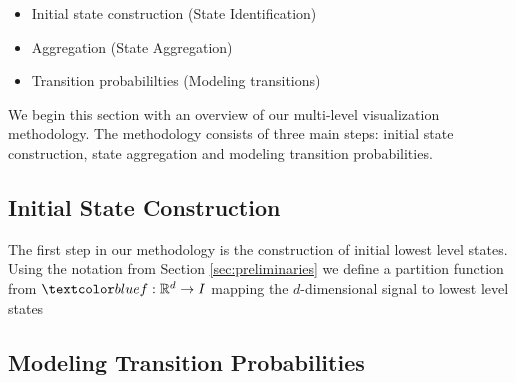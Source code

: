 \begin{itemize}
	\item Initial state construction (State Identification)
	\item Aggregation (State Aggregation)
	\item Transition probabililties (Modeling transitions)
\end{itemize}

We begin this section with an overview of our multi-level visualization methodology. The methodology
consists of three main steps: initial state construction, state aggregation and modeling transition
probabilities.

\subsection{Initial State Construction}
\label{sec:framework-states}

The first step in our methodology is the construction of initial lowest level states. Using the notation
from Section \ref{sec:preliminaries} we define a partition function 
from $\lstopar{f}: \mathbb{R}^d \rightarrow I$ mapping the $d$-dimensional signal to lowest level states

\subsection{Modeling Transition Probabilities}

